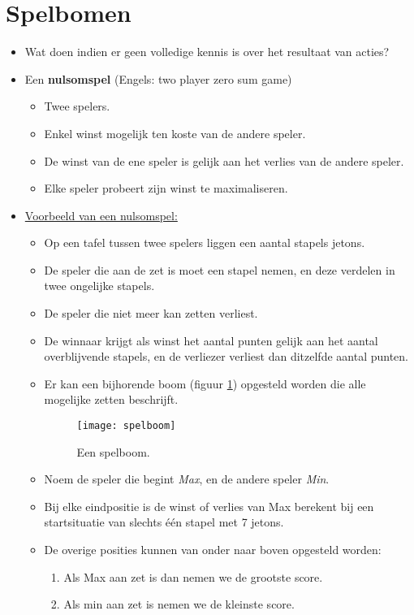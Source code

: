 \section{Spelbomen}
\begin{itemize}
	\item Wat doen indien er geen volledige kennis is over het resultaat van acties?
	\item Een \textbf{nulsomspel} (Engels: two player zero sum game)
	\begin{itemize}
		\item Twee spelers.
		\item Enkel winst mogelijk ten koste van de andere speler.
		\item De winst van de ene speler is gelijk aan het verlies van de andere speler.
		\item Elke speler probeert zijn winst te maximaliseren.
	\end{itemize}
	\item \underline{Voorbeeld van een nulsomspel:}
	\begin{itemize}
		\item Op een tafel tussen twee spelers liggen een aantal stapels jetons.
		\item De speler die aan de zet is moet een stapel nemen, en deze verdelen in twee ongelijke stapels.
		\item De speler die niet meer kan zetten verliest.
		\item De winnaar krijgt als winst het aantal punten gelijk aan het aantal overblijvende stapels, en de verliezer verliest dan ditzelfde aantal punten.
		\item Er kan een bijhorende boom (figuur \ref{fig:spelboom}) opgesteld worden die alle mogelijke zetten beschrijft.
		\begin{figure}
			\texttt{[image: spelboom]}
			\caption{Een spelboom.}
			\label{fig:spelboom}
		\end{figure}
		\item Noem de speler die begint \textit{Max}, en de andere speler \textit{Min}.
		\item Bij elke eindpositie is de winst of verlies van Max berekent bij een startsituatie van slechts één stapel met 7 jetons.
		\item De overige posities kunnen van onder naar boven opgesteld worden:
		\begin{enumerate}
			\item Als Max aan zet is dan nemen we de grootste score.
			\item Als min aan zet is nemen we de kleinste score.
		\end{enumerate} 
	\end{itemize}
\end{itemize}
